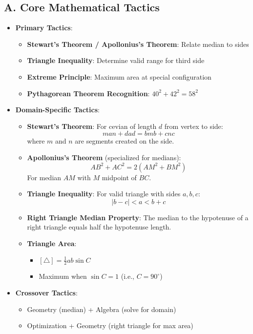 \documentclass[12pt]{article}
\begin{document}
\begin{tacticalbox}
\subsection*{A. Core Mathematical Tactics}
\begin{itemize}[leftmargin=*]
    \item \textbf{Primary Tactics}: 
    \begin{itemize}
        \item \textbf{Stewart's Theorem / Apollonius's Theorem}: Relate median to sides
        \item \textbf{Triangle Inequality}: Determine valid range for third side
        \item \textbf{Extreme Principle}: Maximum area at special configuration
        \item \textbf{Pythagorean Theorem Recognition}: $40^2 + 42^2 = 58^2$
    \end{itemize}
    
    \item \textbf{Domain-Specific Tactics}:
    \begin{itemize}
        \item \textbf{Stewart's Theorem}: For cevian of length $d$ from vertex to side:
        $$man + dad = bmb + cnc$$
        where $m$ and $n$ are segments created on the side.
        
        \item \textbf{Apollonius's Theorem} (specialized for medians):
        $$AB^2 + AC^2 = 2(AM^2 + BM^2)$$
        For median $AM$ with $M$ midpoint of $BC$.
        
        \item \textbf{Triangle Inequality}: For valid triangle with sides $a, b, c$:
        $$|b - c| < a < b + c$$
        
        \item \textbf{Right Triangle Median Property}: 
        The median to the hypotenuse of a right triangle equals half the hypotenuse length.
        
        \item \textbf{Triangle Area}: 
        \begin{itemize}
            \item $[\triangle] = \frac{1}{2}ab\sin C$
            \item Maximum when $\sin C = 1$ (i.e., $C = 90^{\circ}$)
        \end{itemize}
    \end{itemize}
    
    \item \textbf{Crossover Tactics}:
    \begin{itemize}
        \item Geometry (median) + Algebra (solve for domain)
        \item Optimization + Geometry (right triangle for max area)
    \end{itemize}
\end{itemize}
\end{tacticalbox}
\end{document}
